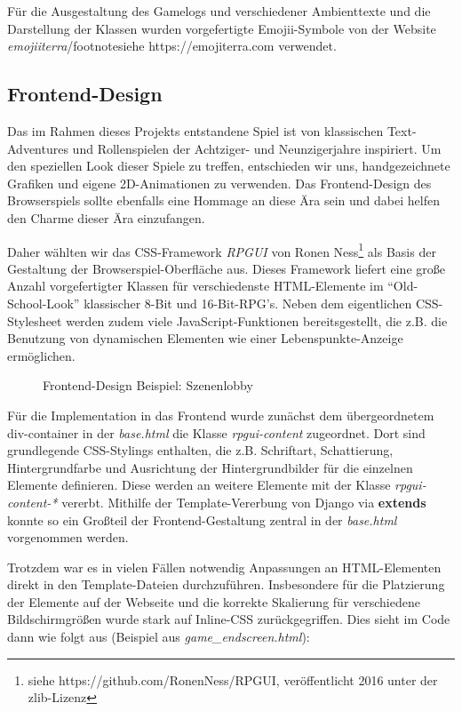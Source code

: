 Für die Ausgestaltung des Gamelogs und verschiedener Ambienttexte und die Darstellung der Klassen wurden vorgefertigte Emojii-Symbole von der Website \textit{emojiiterra}/footnote{siehe https://emojiterra.com} verwendet.

\pagebreak
\subsection{Frontend-Design}
Das im Rahmen dieses Projekts entstandene Spiel ist von klassischen Text-Adventures und Rollenspielen der Achtziger- und Neunzigerjahre inspiriert. Um den speziellen Look dieser Spiele zu treffen, entschieden wir uns, handgezeichnete Grafiken und eigene 2D-Animationen zu verwenden. Das Frontend-Design des Browserspiels sollte ebenfalls eine Hommage an diese Ära sein und dabei helfen den Charme dieser Ära einzufangen. 

Daher wählten wir das CSS-Framework \textit{RPGUI} von Ronen Ness\footnote{siehe https://github.com/RonenNess/RPGUI, veröffentlicht 2016 unter der zlib-Lizenz} als Basis der Gestaltung der Browserspiel-Oberfläche aus. Dieses Framework liefert eine große Anzahl vorgefertigter Klassen für verschiedenste HTML-Elemente im \enquote{Old-School-Look} klassischer 8-Bit und 16-Bit-RPG's. Neben dem eigentlichen CSS-Stylesheet werden zudem viele JavaScript-Funktionen bereitsgestellt, die z.B. die Benutzung von dynamischen Elementen wie einer Lebenspunkte-Anzeige ermöglichen.

\begin{figure}[H]
    \centering
    \caption{Frontend-Design Beispiel: Szenenlobby}
    \label{fig:frontend_rpgui_example}
\end{figure}

Für die Implementation in das Frontend wurde zunächst dem übergeordnetem div-container in der \textit{base.html} die Klasse \textit{rpgui-content} zugeordnet. Dort sind grundlegende CSS-Stylings enthalten, die z.B. Schriftart, Schattierung, Hintergrundfarbe und Ausrichtung der Hintergrundbilder für die einzelnen Elemente definieren. Diese werden an weitere Elemente mit der Klasse \textit{rpgui-content-*} vererbt. Mithilfe der Template-Vererbung von Django via \textbf{extends} konnte so ein Großteil der Frontend-Gestaltung zentral in der \textit{base.html} vorgenommen werden.

Trotzdem war es in vielen Fällen notwendig Anpassungen an HTML-Elementen direkt in den Template-Dateien durchzuführen. Insbesondere für die Platzierung der Elemente auf der Webseite und die korrekte Skalierung für verschiedene Bildschirmgrößen wurde stark auf Inline-CSS zurückgegriffen. Dies sieht im Code dann wie folgt aus (Beispiel aus \textit{game\_endscreen.html}):


